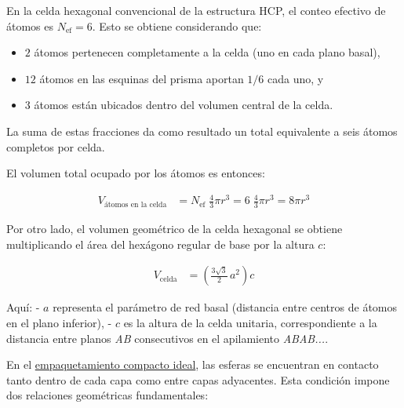 \documentclass{article}
\begin{document}
\vspace{0.4cm}

En la celda hexagonal convencional de la estructura HCP, el conteo efectivo de átomos es \underline{\(N_{\text{ef}}=6\)}.  
Esto se obtiene considerando que:
\begin{itemize}
  \item[$\bullet$] \(2\) átomos pertenecen completamente a la celda (uno en cada plano basal),
  \item[$\bullet$] \(12\) átomos en las esquinas del prisma aportan \(1/6\) cada uno, y
  \item[$\bullet$] \(3\) átomos están ubicados dentro del volumen central de la celda.
\end{itemize}
La suma de estas fracciones da como resultado un total equivalente a seis átomos completos por celda.

El volumen total ocupado por los átomos es entonces:

\begin{equation}
\begin{split}
V_{\text{átomos en la celda}} &= N_{\text{ef}}\;\frac{4}{3}\pi r^{3}
                              = 6\;\frac{4}{3}\pi r^{3}
                              = 8\pi r^{3}
\end{split} \label{eq:vol-atomos-hcp}
\end{equation}

Por otro lado, el volumen geométrico de la celda hexagonal se obtiene multiplicando el área del hexágono regular de base por la altura \(c\):

\begin{equation}
\begin{split}
V_{\text{celda}} &= \left(\frac{3\sqrt{3}}{2}\,a^{2}\right)c
\end{split} \label{eq:vol-celda-hcp}
\end{equation}

Aquí:
- \(a\) representa el parámetro de red basal (distancia entre centros de átomos en el plano inferior),  
- \(c\) es la altura de la celda unitaria, correspondiente a la distancia entre planos \emph{AB} consecutivos en el apilamiento \emph{ABAB...}.

\vspace{0.4cm}

En el \underline{empaquetamiento compacto ideal}, las esferas se encuentran en contacto tanto dentro de cada capa como entre capas adyacentes.  
Esta condición impone dos relaciones geométricas fundamentales:
\end{document}

